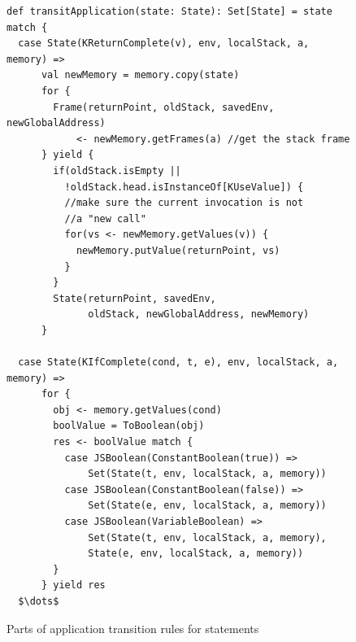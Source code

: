 \documentclass[12pt]{report}
\begin{document}
\begin{figure}
\lstset{language=Scala, mathescape}
\begin{lstlisting}
def transitApplication(state: State): Set[State] = state match {
  case State(KReturnComplete(v), env, localStack, a, memory) =>
      val newMemory = memory.copy(state)
      for {
        Frame(returnPoint, oldStack, savedEnv, newGlobalAddress)
            <- newMemory.getFrames(a) //get the stack frame
      } yield {
        if(oldStack.isEmpty ||
          !oldStack.head.isInstanceOf[KUseValue]) {
          //make sure the current invocation is not
          //a "new call"
          for(vs <- newMemory.getValues(v)) {
            newMemory.putValue(returnPoint, vs)
          }
        }
        State(returnPoint, savedEnv,
              oldStack, newGlobalAddress, newMemory)
      }

  case State(KIfComplete(cond, t, e), env, localStack, a, memory) =>
      for {
        obj <- memory.getValues(cond)
        boolValue = ToBoolean(obj)
        res <- boolValue match {
          case JSBoolean(ConstantBoolean(true)) =>
              Set(State(t, env, localStack, a, memory))
          case JSBoolean(ConstantBoolean(false)) =>
              Set(State(e, env, localStack, a, memory))
          case JSBoolean(VariableBoolean) =>
              Set(State(t, env, localStack, a, memory),
              State(e, env, localStack, a, memory))
        }
      } yield res
  $\dots$

\end{lstlisting}
\caption{Parts of application transition rules for statements}
\label{fig:app-stmt}
\end{figure}
\end{document}
